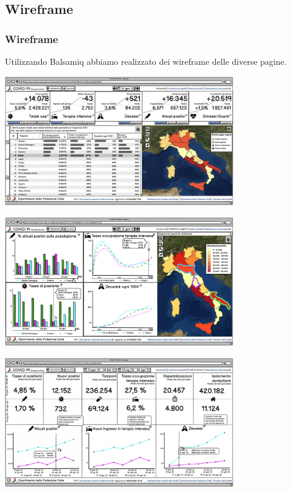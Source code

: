 \documentclass[handout]{beamer}
\begin{document}
		\subsection{Wireframe}
		\begin{frame}
			\frametitle{Wireframe}
			Utilizzando Balsamiq abbiamo realizzato dei wireframe delle diverse pagine. 
		\end{frame}

		\begin{frame}
			\includegraphics[width=10cm]{img/panoramica}
		\end{frame}

		\begin{frame}
			\includegraphics[width=10cm]{img/confronto-regioni}
		\end{frame}

		\begin{frame}
			\includegraphics[width=10cm]{img/new-analisi-periodi}
		\end{frame}
\end{document}
